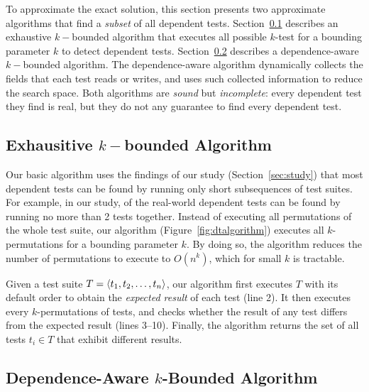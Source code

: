To approximate the exact solution, this section
presents two approximate algorithms that find a \textit{subset} of
all dependent tests.
Section~\ref{sec:basic} describes an exhaustive $k-$bounded algorithm that
executes all possible $k$-test for a bounding parameter $k$
to detect dependent tests.
Section~\ref{sec:advalgorithm} describes a dependence-aware $k-$bounded algorithm.
The dependence-aware algorithm dynamically collects the fields that each test
reads or writes, and uses such collected information to reduce the search space.
Both algorithms are \textit{sound} but \textit{incomplete}:
every dependent test they find is real, but they do not
any guarantee to find every dependent test.


\subsection{Exhausitive $k-$bounded Algorithm}
\label{sec:basic}


Our basic algorithm uses the findings of our study
(Section~\ref{sec:study})
that most dependent tests can be found by running only short
subsequences of test suites. For example,
in our study, \pertange of the real-world dependent tests
can be found by running no more than 2 tests together.
Instead of executing all permutations of the
whole test suite, our algorithm (Figure~\ref{fig:dtalgorithm})
executes all $k$-permutations for a bounding
parameter $k$.
By doing so, the algorithm reduces
the number of permutations to execute
to $O(n^k)$, which for small $k$ is tractable. 


Given a test suite $T =  \langle t_1, t_2, \ldots, t_n \rangle $, our algorithm
first executes $T$ with its default order
to obtain the \emph{expected result} of each test (line 2). 
It then executes every $k$-permutations of tests,
and checks whether the result of any test differs
from the expected result (lines 3--10). Finally, the algorithm returns the set
of all tests $t_i \in T$
that exhibit different results.





\subsection{Dependence-Aware $k$-Bounded Algorithm}
\label{sec:advalgorithm}

